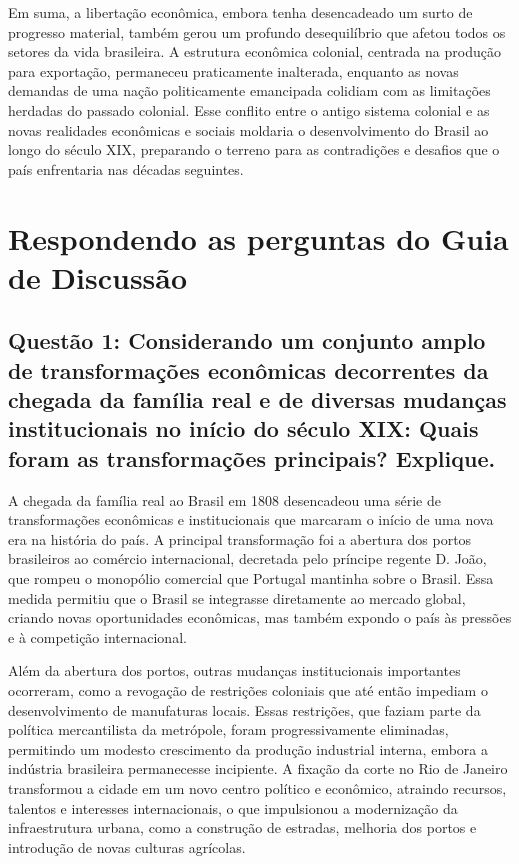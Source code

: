 \documentclass[a4paper,12pt]{article}[abntex2]
\begin{document}
Em suma, a libertação econômica, embora tenha desencadeado um surto de progresso material, também gerou um profundo desequilíbrio que afetou todos os setores da vida brasileira. A estrutura econômica colonial, centrada na produção para exportação, permaneceu praticamente inalterada, enquanto as novas demandas de uma nação politicamente emancipada colidiam com as limitações herdadas do passado colonial. Esse conflito entre o antigo sistema colonial e as novas realidades econômicas e sociais moldaria o desenvolvimento do Brasil ao longo do século XIX, preparando o terreno para as contradições e desafios que o país enfrentaria nas décadas seguintes.

\newpage

\section{\textbf{Respondendo as perguntas do Guia de Discussão}}
\subsection{\textbf{Questão 1: Considerando um conjunto amplo de transformações econômicas decorrentes da chegada da família real e de diversas mudanças institucionais no início do século XIX: Quais foram as transformações principais? Explique.}}

A chegada da família real ao Brasil em 1808 desencadeou uma série de transformações econômicas e institucionais que marcaram o início de uma nova era na história do país. A principal transformação foi a abertura dos portos brasileiros ao comércio internacional, decretada pelo príncipe regente D. João, que rompeu o monopólio comercial que Portugal mantinha sobre o Brasil. Essa medida permitiu que o Brasil se integrasse diretamente ao mercado global, criando novas oportunidades econômicas, mas também expondo o país às pressões e à competição internacional.

Além da abertura dos portos, outras mudanças institucionais importantes ocorreram, como a revogação de restrições coloniais que até então impediam o desenvolvimento de manufaturas locais. Essas restrições, que faziam parte da política mercantilista da metrópole, foram progressivamente eliminadas, permitindo um modesto crescimento da produção industrial interna, embora a indústria brasileira permanecesse incipiente. A fixação da corte no Rio de Janeiro transformou a cidade em um novo centro político e econômico, atraindo recursos, talentos e interesses internacionais, o que impulsionou a modernização da infraestrutura urbana, como a construção de estradas, melhoria dos portos e introdução de novas culturas agrícolas.
\end{document}
